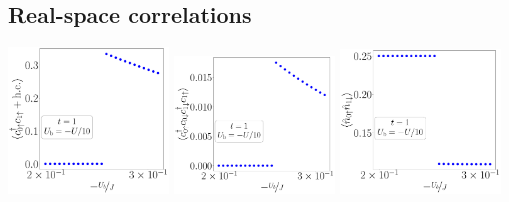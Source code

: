 \documentclass{report}
\numberwithin{equation}{section}
\begin{document}
\subsection*{Real-space correlations}
\begin{center}
	\includegraphics[width=0.32\textwidth]{../figures/r1p-D=1000.00000,t=1.00000,J=30.00000,V=1.50000J,Ub=-Uby10,N=4,U=59.85787,93.55363,25.pdf}
	\includegraphics[width=0.32\textwidth]{../figures/r-od-D=1000.00000,t=1.00000,J=30.00000,V=1.50000J,Ub=-Uby10,N=4,U=59.85787,93.55363,25.pdf}
	\includegraphics[width=0.32\textwidth]{../figures/r-opp-D=1000.00000,t=1.00000,J=30.00000,V=1.50000J,Ub=-Uby10,N=4,U=59.85787,93.55363,25.pdf}


\end{center}
\end{document}
